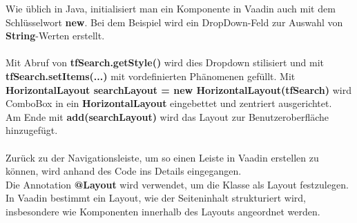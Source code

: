 \documentclass[a4paper,12pt]{scrreprt}
\begin{document}
Wie üblich in Java, initialisiert man ein Komponente in Vaadin auch mit dem Schlüsselwort \textbf{new}. Bei dem Beispiel wird ein DropDown-Feld zur Auswahl von \textbf{String}-Werten erstellt.\\ \\
Mit Abruf von \textbf{tfSearch.getStyle()} wird dies Dropdown stilisiert und mit \textbf{tfSearch.setItems(...)} mit vordefinierten Phänomenen gefüllt. Mit \textbf{HorizontalLayout searchLayout = new HorizontalLayout(tfSearch)} wird ComboBox in ein \textbf{HorizontalLayout}  eingebettet und zentriert ausgerichtet.\\
Am Ende mit \textbf{add(searchLayout)} wird das Layout zur Benutzeroberfläche hinzugefügt.\\ \\
Zurück zu der Navigationsleiste, um so einen Leiste in Vaadin erstellen zu können, wird anhand des Code ins Details eingegangen.\\

Die Annotation \textbf{@Layout} wird verwendet, um die Klasse als Layout festzulegen. In Vaadin bestimmt ein Layout, wie der Seiteninhalt strukturiert wird, insbesondere wie Komponenten innerhalb des Layouts angeordnet werden.\\	
\end{document}
